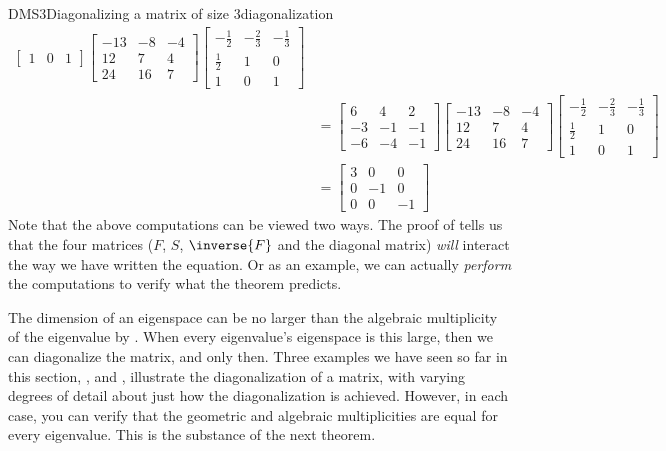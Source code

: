 \begin{example}{DMS3}{Diagonalizing a matrix of size 3}{diagonalization}
\begin{align*}
{\begin{bmatrix}
1 & 0 & 1
\end{bmatrix}
}
\begin{bmatrix}
-13 & -8 & -4\\
12 & 7 & 4\\
24 & 16 & 7
\end{bmatrix}
\begin{bmatrix}
-\frac{1}{2} & -\frac{2}{3} & -\frac{1}{3}\\
\frac{1}{2} & 1 & 0\\
1 & 0 & 1
\end{bmatrix}\\
&=
\begin{bmatrix}
6 & 4 & 2\\
-3 & -1 & -1\\
-6 & -4 & -1
\end{bmatrix}
\begin{bmatrix}
-13 & -8 & -4\\
12 & 7 & 4\\
24 & 16 & 7
\end{bmatrix}
\begin{bmatrix}
-\frac{1}{2} & -\frac{2}{3} & -\frac{1}{3}\\
\frac{1}{2} & 1 & 0\\
1 & 0 & 1
\end{bmatrix}\\
&=
\begin{bmatrix}
3 & 0 & 0\\
0 & -1 & 0\\
0 & 0 & -1
\end{bmatrix}
%
\end{align*}
%
Note that the above computations can be viewed two ways.  The proof of  tells us that the four matrices ($F$, $S$, $\inverse{F}$ and the diagonal matrix) {\em will} interact the way we have written the equation.  Or as an example, we can actually {\em perform} the computations to verify what the theorem predicts.
\end{example}
%
The dimension of an eigenspace can be no larger than the algebraic multiplicity of the eigenvalue by .  When every eigenvalue's eigenspace is this large, then we can diagonalize the matrix, and only then.   Three examples we have seen so far in this section,  ,   and ,  illustrate the diagonalization of a matrix, with varying degrees of detail about just how the diagonalization is achieved.  However, in each case, you can verify that the geometric and algebraic multiplicities are equal for every eigenvalue.  This is the substance of the next theorem.
